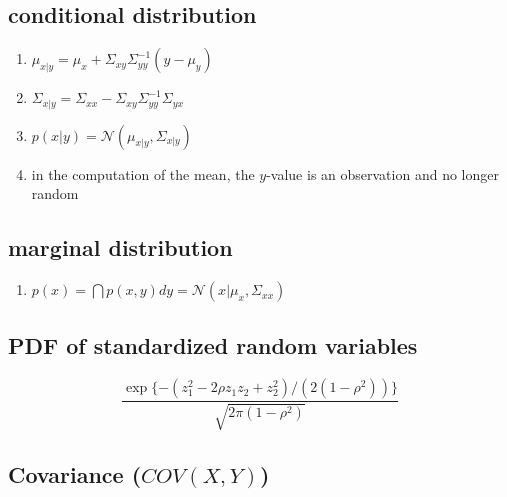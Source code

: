 \subsection{conditional distribution \cite{mfml-1}} \label{Normal distribution: Bivariate/ Multivariate: conditional distribution}

\begin{enumerate}[itemsep=0.3cm]
    \item $
        \mu_{x|y} 
        = \mu_x + \Sigma_{xy} \Sigma_{yy}^{-1} (y-\mu_y)
    $

    \item $
        \Sigma_{x|y}
        = \Sigma_{xx} - \Sigma_{xy} \Sigma_{yy}^{-1} \Sigma_{yx}
    $
    
    \item $
        p(x|y) = \mathcal{N}(\mu_{x|y}, \Sigma_{x|y})
    $

    \item in the computation of the mean, the $y$-value is an observation and no longer random
\end{enumerate}


\subsection{marginal distribution \cite{mfml-1}} \label{Normal distribution: Bivariate/ Multivariate: marginal distribution}

\begin{enumerate}[itemsep=0.3cm]
    \item $
        p(x)
        = \dint p(x,y)dy
        = \mathcal{N}(x|\mu_x, \Sigma_{xx})
    $

\end{enumerate}


\subsection{PDF of standardized random variables \cite{ism-1}} \label{Normal distribution: Bivariate/ Multivariate: PDF of standardized random variables}

\[
    \dfrac{
        \exp\{ 
            -(z_1^2 - 2\rho z_1 z_2 + z_2^2)/
            (2(1-\rho^2))
        \}
    }{
        \sqrt{2\pi(1-\rho^2)}
    }
\]


\subsection{Covariance ($COV(X,Y)$) \cite{ism-1}} \label{Normal distribution: Bivariate/ Multivariate: Covariance}

